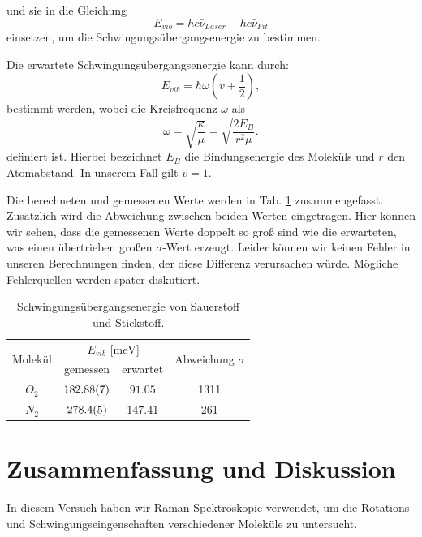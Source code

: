 \documentclass[11pt]{article}
\begin{document}
und sie in die Gleichung
\begin{equation}
E_{vib} = hc\bar{\nu}_{Laser} - hc\bar{\nu}_{Fit}
\end{equation}
einsetzen, um die Schwingungsübergangsenergie zu bestimmen.

Die erwartete Schwingungsübergangsenergie kann durch:
\begin{equation}
E_{vib} = \hbar \omega \left( v + \dfrac{1}{2} \right),
\end{equation}
bestimmt werden, wobei die Kreisfrequenz $\omega$ als 
\begin{equation}
\omega = \sqrt{\dfrac{\kappa}{\mu}} = \sqrt{\dfrac{2E_{B}}{r^2\mu}}.
\end{equation}
definiert ist. Hierbei bezeichnet $E_B$ die Bindungsenergie des Moleküls und $r$ den Atomabstand. In unserem Fall gilt $v = 1$.

Die berechneten und gemessenen Werte werden in Tab. \ref{tab:N_O} zusammengefasst. Zusätzlich wird die Abweichung zwischen beiden Werten eingetragen. Hier können wir sehen, dass die gemessenen Werte doppelt so groß sind wie die erwarteten, was einen übertrieben großen $\sigma$-Wert erzeugt. Leider können wir keinen Fehler in unseren Berechnungen finden, der diese Differenz verursachen würde. Mögliche Fehlerquellen werden später diskutiert.

\begin{table}[!htbp]
 \begin{center}
  \caption{ \small Schwingungsübergangsenergie von Sauerstoff und Stickstoff.}
  \label{tab:N_O}
  \renewcommand{\arraystretch}{1.3}
  \begin{tabular}{|c|c|c|c|}
  \hline

\multirow{2}{*}{Molekül}& \multicolumn{2}{c|}{$E_{vib}$ [$\unit{\milli\electronvolt}$]} &  \multirow{2}{*}{ Abweichung $\sigma$} \\ \cline{2-3} %
 					 & gemessen & erwartet &    			\\
  \hline
  \hline
  $O_2$	&	$\num{182.88 \pm 0.07}$	&	$\num{91.05}$ &	1311\\
  $N_2$	&	$\num{278.4 \pm 0.5}$	&	$\num{147.41}$&	261\\ 
  \hline
  \end{tabular}
  \renewcommand{\arraystretch}{1}
 \end{center}
\end{table}

\section{Zusammenfassung und Diskussion}
In diesem Versuch haben wir Raman-Spektroskopie verwendet, um die Rotations- und Schwingungseingenschaften verschiedener Moleküle zu untersucht.
\end{document}
